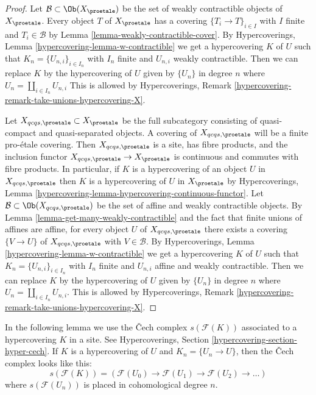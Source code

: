 \begin{proof}
Let $\mathcal{B} \subset \Ob(X_\proetale)$ be the set of weakly contractible
objects of $X_\proetale$. Every object $T$ of $X_\proetale$ has a
covering $\{T_i \to T\}_{i \in I}$ with $I$ finite and $T_i \in \mathcal{B}$ by
Lemma \ref{lemma-weakly-contractible-cover}.
By Hypercoverings, Lemma \ref{hypercovering-lemma-w-contractible}
we get a hypercovering $K$ of $U$ such that $K_n = \{U_{n, i}\}_{i \in I_n}$
with $I_n$ finite and $U_{n, i}$ weakly contractible.
Then we can replace $K$ by the hypercovering of $U$ given by $\{U_n\}$
in degree $n$ where $U_n = \coprod_{i \in I_n} U_{n, i}$
This is allowed by
Hypercoverings, Remark \ref{hypercovering-remark-take-unions-hypercovering-X}.

\medskip\noindent
Let $X_{qcqs, \proetale} \subset X_\proetale$ be the full subcategory
consisting of quasi-compact and quasi-separated objects.
A covering of $X_{qcqs, \proetale}$ will be a finite pro-\'etale covering.
Then $X_{qcqs, \proetale}$ is a site, has fibre products, and
the inclusion functor $X_{qcqs, \proetale} \to X_\proetale$ is continuous
and commutes with fibre products.
In particular, if $K$ is a hypercovering of an object $U$ in
$X_{qcqs, \proetale}$ then $K$ is a hypercovering of $U$ in $X_\proetale$
by Hypercoverings, Lemma
\ref{hypercovering-lemma-hypercovering-continuous-functor}.
Let $\mathcal{B} \subset \Ob(X_{qcqs, \proetale})$ be the set of
affine and weakly contractible objects. By 
Lemma \ref{lemma-get-many-weakly-contractible}
and the fact that finite unions of affines are affine,
for every object $U$ of $X_{qcqs, \proetale}$ there exists a covering
$\{V \to U\}$ of $X_{qcqs, \proetale}$ with $V \in \mathcal{B}$.
By Hypercoverings, Lemma \ref{hypercovering-lemma-w-contractible}
we get a hypercovering $K$ of $U$ such that $K_n = \{U_{n, i}\}_{i \in I_n}$
with $I_n$ finite and $U_{n, i}$ affine and weakly contractible.
Then we can replace $K$ by the hypercovering of $U$
given by $\{U_n\}$ in degree $n$ where
$U_n = \coprod_{i \in I_n} U_{n, i}$. This is allowed by
Hypercoverings, Remark \ref{hypercovering-remark-take-unions-hypercovering-X}.
\end{proof}

\noindent
In the following lemma we use the {\v C}ech complex $s(\mathcal{F}(K))$
associated to a hypercovering $K$ in a site. See
Hypercoverings, Section \ref{hypercovering-section-hyper-cech}.
If $K$ is a hypercovering of $U$ and $K_n = \{U_n \to U\}$, then
the {\v C}ech complex looks like this:
$$
s(\mathcal{F}(K)) =
\left(
\mathcal{F}(U_0) \to \mathcal{F}(U_1) \to \mathcal{F}(U_2) \to \ldots
\right)
$$
where $s(\mathcal{F}(U_n))$ is placed in cohomological degree $n$.

